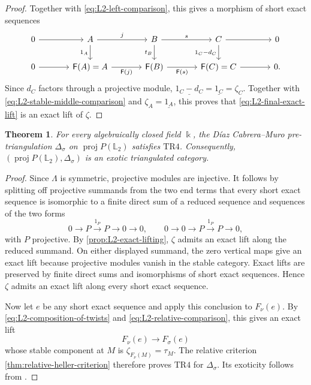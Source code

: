 \documentclass[a4paper,11pt,reqno]{amsart}
\newtheorem{theorem}{Theorem}[section]
\theoremstyle{definition}
\theoremstyle{plain}
\numberwithin{equation}{section}
\newcommand{\kk}{\Bbbk}
\begin{document}
\begin{proof}
Together with \eqref{eq:L2-left-comparison}, this gives a morphism of
short exact sequences
\begin{equation}
\label{eq:L2-final-exact-lift}
\begin{tikzcd}[column sep=large]
0\arrow[r]&A\arrow[r,"j"]\arrow[d,"1_A"']&
B\arrow[r,"s"]\arrow[d,"t_B"']&
C\arrow[r]\arrow[d,"1_C-d_C"']&0\\
0\arrow[r]&\mathsf F(A)=A\arrow[r,"\mathsf F(j)"']&
\mathsf F(B)\arrow[r,"\mathsf F(s)"']&
\mathsf F(C)=C\arrow[r]&0.
\end{tikzcd}
\end{equation}
Since \(d_C\) factors through a projective module,
\(\underline{1_C-d_C}=\underline{1_C}=\zeta_C\).  Together with
\eqref{eq:L2-stable-middle-comparison} and
\(\zeta_A=\underline{1_A}\), this proves that
\eqref{eq:L2-final-exact-lift} is an exact lift of \(\zeta\).
\end{proof}

\begin{theorem}
\label{thm:L2-octahedral}
For every algebraically closed field \(\kk\), the
D\'iaz Cabrera--Muro pre-triangulation \(\Delta_\sigma\) on
\(\operatorname{proj}P(\mathbb L_2)\) satisfies \(\mathrm{TR4}\).
Consequently,
\((\operatorname{proj}P(\mathbb L_2),\Delta_\sigma)\) is an exotic
triangulated category.
\end{theorem}

\begin{proof}
Since \(\Lambda\) is symmetric, projective modules are injective.  It
follows by splitting off projective summands from the two end terms that
every short exact sequence is isomorphic to a finite direct sum of a
reduced sequence and sequences of the two forms
\[
 0\longrightarrow P\xrightarrow{1_P}P\longrightarrow0\longrightarrow0,
 \qquad
 0\longrightarrow0\longrightarrow P\xrightarrow{1_P}P\longrightarrow0,
\]
with \(P\) projective.  By \cref{prop:L2-exact-lifting}, \(\zeta\) admits
an exact lift along the reduced summand.  On either displayed summand, the
zero vertical maps give
an exact lift because projective modules vanish in the stable category.
Exact lifts are preserved by finite direct sums and isomorphisms of short
exact sequences.  Hence \(\zeta\) admits an exact lift along every short
exact sequence.

Now let \(e\) be any short exact sequence and apply this conclusion to
\(F_\nu(e)\).  By
\eqref{eq:L2-composition-of-twists} and
\eqref{eq:L2-relative-comparison}, this gives an exact lift
\[
 F_\nu(e)\longrightarrow F_\sigma(e)
\]
whose stable component at \(M\) is
\(\zeta_{F_\nu(M)}=\tau_M\).  The relative criterion
\cref{thm:relative-heller-criterion} therefore proves
\(\mathrm{TR4}\) for \(\Delta_\sigma\).  Its exoticity follows from
\cite[Corollary~4.2]{DiazCabreraMuro2026}.
\end{proof}
\end{document}
